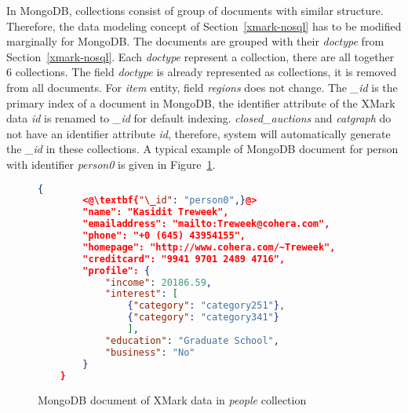 
In MongoDB, collections consist of group of documents with similar structure. Therefore, the data modeling concept of Section~\ref{xmark-nosql} has to be modified marginally for MongoDB. The documents are grouped with their \textit{doctype} from Section~\ref{xmark-nosql}. Each \textit{doctype} represent a collection, there are all together 6 collections. The field \textit{doctype} is already represented as collections, it is removed from all documents.  
For \textit{item} entity,  field \textit{regions} does not change. The \textit{\_id} is the primary index of a document in MongoDB, the identifier attribute of the XMark data \textit{id} is renamed to \textit{\_id} for default indexing.  \textit{closed\_auctions} and \textit{catgraph} do not have an identifier attribute \textit{id}, therefore, system will automatically generate the \textit{\_id} in these collections.
A typical example of MongoDB document for person with identifier \textit{person0} is given in Figure~\ref{code:mongodb-person0}.	

\begin{figure}[hbt]
\begin{lstlisting}[language=JSON, basicstyle =\scriptsize]
    {
    	<@\textbf{"\_id": "person0",}@>
    	"name": "Kasidit Treweek",
    	"emailaddress": "mailto:Treweek@cohera.com",
    	"phone": "+0 (645) 43954155",
    	"homepage": "http://www.cohera.com/~Treweek",
    	"creditcard": "9941 9701 2489 4716",
    	"profile": {
    		"income": 20186.59,
    		"interest": [
    			{"category": "category251"},
    			{"category": "category341"}
    			],
    		"education": "Graduate School",
    		"business": "No"
    	}
    }
\end{lstlisting}
\caption{MongoDB document of XMark data in \textit{people} collection}
\label{code:mongodb-person0}
\end{figure}